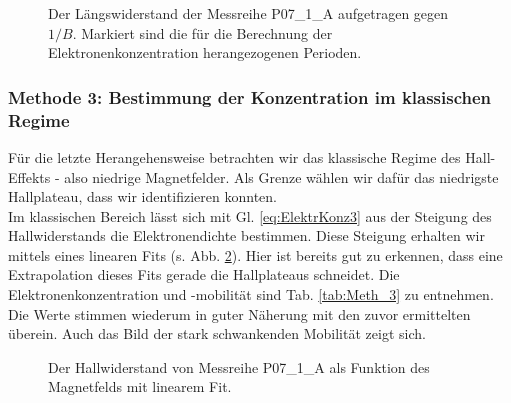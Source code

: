 \begin{figure}[htbp]
	\centering
	
	\caption{Der Längswiderstand der Messreihe P07\_1\_A aufgetragen gegen $1/B$. Markiert sind die für die Berechnung der Elektronenkonzentration herangezogenen Perioden.}
	\label{abb:P07_Meth_2}
\end{figure}

\begin{table}[h!]
	\centering
	\caption{Bei Messreihe P07\_1\_A betrachtete Minima der SdH-Oszillation}
	
	\label{tab:P07_Meth_2}
\end{table}

\begin{table}[h!]
	\centering
	\caption{Die mit Methode 2 bestimmten E-konzentrationen und -mobilitäten}
	
	\label{tab:Meth_2}
\end{table}
\newpage
\subsubsection{Methode 3: Bestimmung der Konzentration im klassischen Regime}
Für die letzte Herangehensweise betrachten wir das klassische Regime des Hall-Effekts - also niedrige Magnetfelder. Als Grenze wählen wir dafür das niedrigste Hallplateau, dass wir identifizieren konnten.\\

Im klassischen Bereich lässt sich mit Gl. \ref{eq:ElektrKonz3} aus der Steigung des Hallwiderstands die Elektronendichte bestimmen. Diese Steigung erhalten wir mittels eines linearen Fits (s. Abb. \ref{abb:P07_Meth_3}). Hier ist bereits gut zu erkennen, dass eine Extrapolation dieses Fits gerade die Hallplateaus schneidet. Die Elektronenkonzentration und -mobilität sind Tab. \ref{tab:Meth_3} zu entnehmen. Die Werte stimmen wiederum in guter Näherung mit den zuvor ermittelten überein. Auch das Bild der stark schwankenden Mobilität zeigt sich.
\begin{figure}[htbp]
	\centering
	
	\caption{Der Hallwiderstand von Messreihe P07\_1\_A  als Funktion des Magnetfelds mit linearem Fit. }
	\label{abb:P07_Meth_3}
\end{figure}

\begin{table}[h]
	\centering
	\caption{Die mit Methode 3 bestimmten E-konzentrationen und -mobilitäten}
	
	\label{tab:Meth_3}
\end{table}

